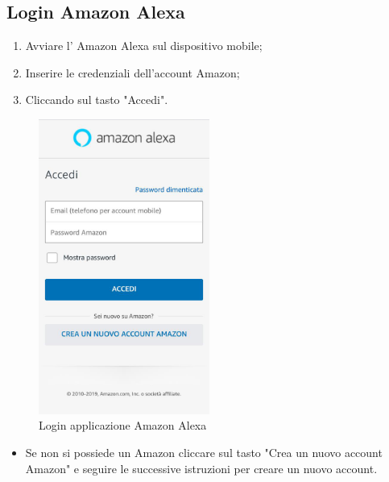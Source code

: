 \subsection{Login Amazon Alexa}
\begin{enumerate}
\item Avviare l' Amazon Alexa sul dispositivo mobile;
\item Inserire le credenziali dell'account Amazon; 
\item Cliccando sul tasto "Accedi".
\end{enumerate}
\begin{figure}[H]
	\centering
	\includegraphics[width=0.5\textwidth]{images/accessoAlexa.png}
	\caption{Login applicazione Amazon Alexa}
\end{figure}

\begin{itemize}
 \item  Se non si possiede un  Amazon cliccare sul tasto "Crea un nuovo account Amazon" e seguire le successive istruzioni per creare un nuovo account.
 \end{itemize}
 

